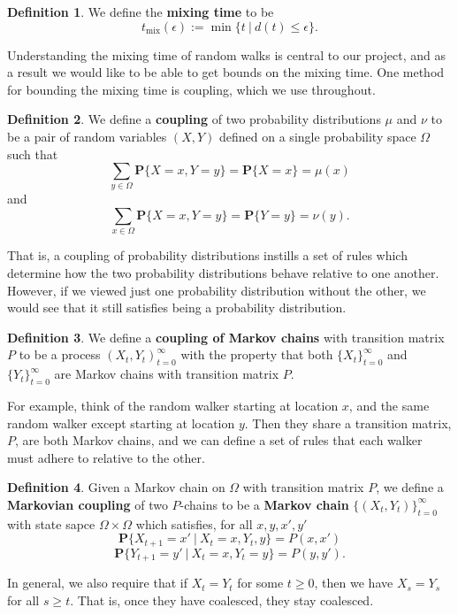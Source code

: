 \documentclass[10pt,a4paper]{amsart}
\theoremstyle{definition}
\newtheorem{definition}{Definition}
\numberwithin{definition}{section}
\begin{document}
\begin{definition}
We define the \textbf{mixing time} to be 
\[ t_{\text{mix}} (\epsilon) := \min \{t \ | \ d(t) \leq \epsilon\}. \]
\end{definition}

Understanding the mixing time of random walks is central to our project, and as a result we would like to be able to get bounds on the mixing time. One method for bounding the mixing time is coupling, which we use throughout. 
\begin{definition}
We define a \textbf{coupling} of two probability distributions $\mu$ and $\nu$ to be a pair of random variables $(X,Y)$ defined on a single probability space $\Omega$ such that 
\[ \sum_{y \in \Omega} \mathbf{P} \{X = x, Y = y\} = \mathbf{P} \{X = x\} = \mu(x) \]
and 
\[ \sum_{x \in \Omega} \mathbf{P} \{X = x, Y = y\} = \mathbf{P} \{Y = y\} = \nu(y).\]
\end{definition}
\noindent That is, a coupling of probability distributions instills a set of rules which determine how the two probability distributions behave relative to one another. However, if we viewed just one probability distribution without the other, we would see that it still satisfies being a probability distribution.

\begin{definition}
We define a \textbf{coupling of Markov chains} with transition matrix $P$ to be a process $(X_t, Y_t)_{t=0}^{\infty}$ with the property that both $\{X_t\}_{t=0}^{\infty}$ and $\{Y_t\}_{t=0}^\infty$ are Markov chains with transition matrix $P$. 
\end{definition}
\noindent For example, think of the random walker starting at location $x$, and the same random walker except starting at location $y$. Then they share a transition matrix, $P$, are both Markov chains, and we can define a set of rules that each walker must adhere to relative to the other.

\begin{definition}
Given a Markov chain on $\Omega$ with transition matrix $P$, we define a \textbf{Markovian coupling} of two $P$-chains to be a \textbf{Markov chain} $\{(X_t, Y_t)\}_{t=0}^{\infty}$ with state sapce $\Omega \times \Omega$ which satisfies, for all $x, y, x', y'$
\[\mathbf{P} \{ X_{t+1} = x' \ | \ X_t =x, Y_t, y\} = P(x,x') \]
\[\mathbf{P} \{ Y_{t+1} = y' \ | \ X_t = x, Y_t = y\} = P(y,y'). \]

In general, we also require that if $X_t = Y_t$ for some $t \geq 0$, then we have $X_s = Y_s$ for all $s \geq t$. That is, once they have coalesced, they stay coalesced. 
\end{definition}
\end{document}
